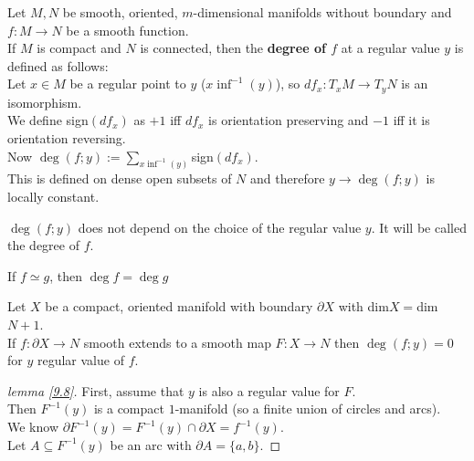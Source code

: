\begin{definition}\label{9.5}
    Let $M,N$ be smooth, oriented, $m$-dimensional manifolds without boundary and $f:M\to N$ be a smooth function.\\
    If $M$ is compact and $N$ is connected, then the \textbf{degree of $f$} at a regular value $y$ is defined as follows:\\
    Let $x\in M$ be a regular point to $y$ ($x\inf^{-1}(y)$), so $df_x:T_xM\to T_yN$ is an isomorphism.\\
    We define sign$(df_x)$ as $+1$ iff $df_x$ is orientation preserving and $-1$ iff it is orientation reversing.\\
    Now $\deg(f;y):=\sum\limits_{x\inf^{-1}(y)}$sign$(df_x)$.\\
    This is defined on dense open subsets of $N$ and therefore $y\to\deg(f;y)$ is locally constant.
\end{definition}
\begin{theorem}[A]\label{9.6}
    $\deg(f;y)$ does not depend on the choice of the regular value $y$. It will be called the degree of $f$.
\end{theorem}
\begin{theorem}[B]\label{9.7}
    If $f\simeq g$, then $\deg f=\deg g$
\end{theorem}
\begin{lemma}\label{9.8}
    Let $X$ be a compact, oriented manifold with boundary $\partial X$ with dim$X=$dim$N+1$.\\
    If $f:\partial X\to N$ smooth extends to a smooth map $F:X\to N$ then $\deg(f;y)=0$ for $y$ regular value of $f$.
\end{lemma}
\begin{proof}[lemma \ref{9.8}]
    First, assume that $y$ is also a regular value for $F$.\\
    Then $F^{-1}(y)$ is a compact $1$-manifold (so a finite union of circles and arcs).\\
    We know $\partial F^{-1}(y)=F^{-1}(y)\cap\partial X=f^{-1}(y)$.\\
    Let $A\subseteq F^{-1}(y)$ be an arc with $\partial A=\{a,b\}$.
\end{proof}